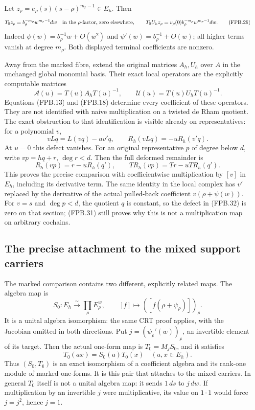 Let \(z_\rho=e_\rho(s)(s-\rho)^{m_\rho-1}\in E_h\). Then
\[
 T_0z_\rho=b_\rho^{-m_\rho}w^{m_\rho-1}dw
       \quad\hbox{in the \(\rho\)-factor, zero elsewhere},
 \qquad
 T_0U_hz_\rho=v_\rho(0)b_\rho^{-m_\rho}
                       w^{m_\rho-1}dw.
 \tag{FPB.29}\label{eq:fpb-terminal}
\]
Indeed \(\psi(w)=b_\rho^{-1}w+O(w^2)\) and
\(\psi'(w)=b_\rho^{-1}+O(w)\); all higher terms vanish at
degree \(m_\rho\). Both displayed terminal coefficients are nonzero.

Away from the marked fibre, extend the original matrices \(A_h,U_h\)
over \(A\) in the unchanged global monomial basis. Their exact local
operators are the explicitly computable matrices
\[
 \mathcal A(u)=T(u)A_hT(u)^{-1},\qquad
 \mathcal U(u)=T(u)U_hT(u)^{-1}.
 \tag{FPB.30}\label{eq:fpb-transported-operators}
\]
Equations (FPB.13) and (FPB.18) determine every coefficient of these
operators. They are not identified with naive multiplication on a
twisted de Rham quotient. The exact obstruction to that identification
is visible already on representatives: for a polynomial \(v\),
\[
 vLq=L(vq)-u v'q,\qquad
 R_h(vLq)=-uR_h(v'q).
 \tag{FPB.31}\label{eq:fpb-Leibniz}
\]
At \(u=0\) this defect vanishes. For an original representative
\(p\) of degree below \(d\), write \(vp=hq+r\), \(\deg r<d\).
Then the full deformed remainder is
\[
 R_h(vp)=r-uR_h(q'),
 \qquad
 T R_h(vp)=T r-uT R_h(q').
 \tag{FPB.32}\label{eq:fpb-mult-remainder}
\]
This proves the precise comparison with coefficientwise multiplication
by \([v]\) in \(E_h\), including its derivative term. The same
identity in the local complex has \(v'\) replaced by the derivative
of the actual pulled-back coefficient \(v(\rho+\psi(w))\).
For \(v=s\) and \(\deg p<d\), the quotient \(q\) is constant,
so the defect in (FPB.32) is zero on that section; (FPB.31) still
proves why this is not a multiplication map on arbitrary cochains.

\subsection{The precise attachment to the mixed support carriers}

The marked comparison contains two different, explicitly related
maps. The algebra map is
\[
 S_0:E_h\xrightarrow{\sim}\prod_\rho E_\rho^w,
 \qquad [f]\longmapsto([f(\rho+\psi_\rho)])_\rho.
 \tag{FPB.33}\label{eq:fpb-ring-map}
\]
It is a unital algebra isomorphism: the same CRT proof applies, with
the Jacobian omitted in both directions. Put
\(j=(\psi_\rho'(w))_\rho\), an invertible element of its target.
Then the actual one-form map is \(T_0=M_jS_0\), and it satisfies
\[
 T_0(a x)=S_0(a)T_0(x)\quad(a,x\in E_h).
 \tag{FPB.34}\label{eq:fpb-semilinear}
\]
Thus \((S_0,T_0)\) is an exact isomorphism of a coefficient algebra
and its rank-one module of marked one-forms. It is this pair that
attaches to the mixed carriers. In general \(T_0\) itself is not
a unital algebra map: it sends \(1\,ds\) to \(j\,dw\). If
multiplication by an invertible \(j\) were multiplicative, its value
on \(1\cdot1\) would force \(j=j^2\), hence \(j=1\).

